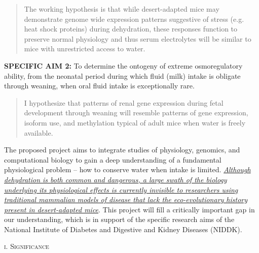 \documentclass[11pt]{article}
\begin{document}
\begin{quote}
The working hypothesis is that while desert-adapted mice may demonstrate genome wide expression patterns suggestive of stress (e.g. heat shock proteins) during dehydration, these responses function to preserve normal physiology and thus serum electrolytes will be similar to mice with unrestricted access to water. 

\end{quote}

\noindent \textbf{SPECIFIC AIM 2:} To determine the ontogeny of extreme osmoregulatory ability, from the neonatal period during which fluid (milk) intake is obligate through weaning, when oral fluid intake is exceptionally rare. 

\begin{quote}
I hypothesize that patterns of renal gene expression during fetal development through weaning will resemble patterns of gene expression, isoform use, and methylation typical of adult mice when water is freely available. 

\end{quote}

The proposed project aims to integrate studies of physiology, genomics, and computational biology to gain a deep understanding of a fundamental physiological problem – how to conserve water when intake is limited. \ul{\emph{Although dehydration is both common and dangerous, a large swath of the biology underlying its physiological effects is currently invisible to researchers using traditional mammalian models of disease that lack the eco-evolutionary history present in desert-adapted mice}}. This project will fill a critically important gap in our understanding, which is in support of the specific research aims of the National Institute of Diabetes and Digestive and Kidney Diseases (NIDDK).

\newpage
{}
\pagestyle{fancy}
\setcounter{page}{2}
\normalsize 
\begin{center}
\textsc{{i. Significance}} \\
\end{center}
\end{document}
